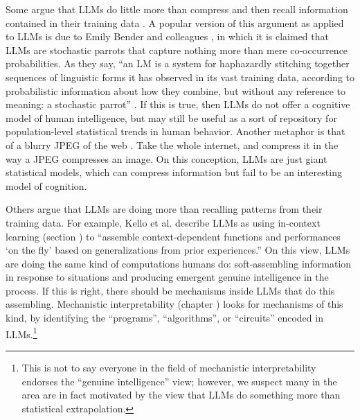 Some argue that LLMs do little more than
compress and then recall information contained in their training data
\cite{bender2021dangers, chiang2023jpeg}. A popular version of this argument
as applied to LLMs is due to Emily Bender and colleagues
\cite{bender2021dangers}, in which it is claimed that LLMs are
stochastic parrots that capture nothing more than mere co-occurrence
probabilities. As they say, ``an LM is a system for
haphazardly stitching together sequences of linguistic forms it has observed in
its vast training data, according to probabilistic information about how they
combine, but without any reference to meaning: a stochastic parrot'' \cite[p.~617]{bender2021dangers}.  If
this is true, then LLMs do not offer a cognitive model of human intelligence,
but may still be useful as a sort of repository for population-level
statistical trends in human behavior.
Another metaphor is that of a blurry JPEG of the web
\cite{chiang2023jpeg}. Take the whole internet, and compress it in the way a
JPEG compresses an image. On this conception, LLMs are just giant statistical
models, which can compress information but fail to be an interesting model of cognition.

Others argue that LLMs are doing more than recalling patterns from their training data. For example, Kello et al. \cite{kello2026contextual} describe LLMs as using in-context learning (section ) to ``assemble context-dependent functions
and performances `on the fly' based on generalizations from prior experiences.'' On this view, LLMs are doing the same kind of computations humans do: soft-assembling information in response to situations and producing emergent genuine intelligence in the process. If this is right, there should be mechanisms inside LLMs that do this assembling. Mechanistic interpretability (chapter ) looks for mechanisms of this kind, by identifying the ``programs'', ``algorithms'', or ``circuits'' encoded in LLMs.\footnote{This is not to say everyone in the field of mechanistic interpretability endorses the ``genuine intelligence'' view; however, we suspect many in the area are in fact motivated by the view that LLMs do something more than statistical extrapolation.}

